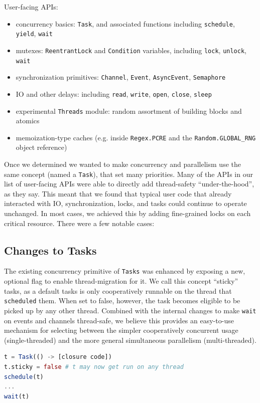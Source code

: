 \documentclass{juliacon}
\begin{document}
User-facing APIs:
\begin{itemize}
\item concurrency basics: \verb|Task|, and associated functions including \verb|schedule|, \verb|yield|, \verb|wait|
\item mutexes: \verb|ReentrantLock| and \verb|Condition| variables, including \verb|lock|, \verb|unlock|, \verb|wait|
\item synchronization primitives: \verb|Channel|, \verb|Event|, \verb|AsyncEvent|, \verb|Semaphore|
\item IO and other delays: including \verb|read|, \verb|write|, \verb|open|, \verb|close|, \verb|sleep|
\item experimental \verb|Threads| module: random assortment of building blocks and atomics
\item memoization-type caches (e.g. inside \verb|Regex.PCRE| and the \verb|Random.GLOBAL_RNG| object reference)
\end{itemize}

Once we determined we wanted to make concurrency and parallelism use the same concept (named a \verb|Task|), that set many priorities. Many of the APIs in our list of user-facing APIs were able to directly add thread-safety ``under-the-hood'', as they say. This meant that we found that typical user code that already interacted with IO, synchronization, locks, and tasks could continue to operate unchanged. In most cases, we achieved this by adding fine-grained locks on each critical resource. There were a few notable cases:

\subsection{Changes to Tasks}
\label{subsub:integration-tasks}

The existing concurrency primitive of \verb|Tasks| was enhanced by exposing a new, optional flag to enable thread-migration for it. We call this concept ``sticky'' tasks, as a default tasks is only cooperatively runnable on the thread that \verb|scheduled| them. When set to false, however, the task becomes eligible to be picked up by any other thread. Combined with the internal changes to make \verb|wait| on events and channels thread-safe, we believe this provides an easy-to-use mechanism for selecting between the simpler cooperatively concurrent usage (single-threaded) and the more general simultaneous parallelism (multi-threaded).

\begin{lstlisting}[language = Julia]
t = Task(() -> [closure code])
t.sticky = false # t may now get run on any thread
schedule(t)
...
wait(t)
\end{lstlisting}
\end{document}
